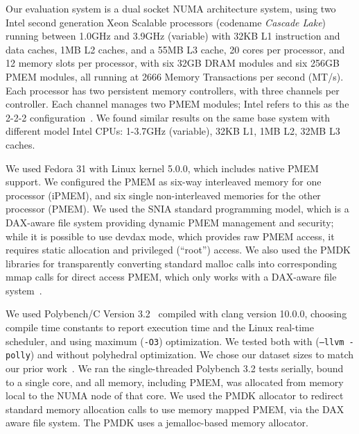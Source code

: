 
Our evaluation system is a dual socket NUMA architecture system, using two Intel\textsuperscript{\textregistered} second generation Xeon\textsuperscript{\textregistered} Scalable processors (codename \textit{Cascade Lake}) running between 1.0GHz and 3.9GHz (variable) with 32KB L1 instruction and data caches, 1MB L2 caches, and a 55MB L3 cache, 20 cores per processor, and 12 memory slots per processor, with six 32GB DRAM modules and six 256GB PMEM modules, all running at 2666 Memory Transactions per second (MT/s). Each processor has two persistent memory controllers, with three channels per controller.  Each channel manages two PMEM modules; Intel refers to this as the 2-2-2 configuration~\cite{intel2019quickstart}. We found similar results on the same base system with different model Intel CPUs: 1-3.7GHz (variable), 32KB L1, 1MB L2, 32MB L3 caches.

We used Fedora 31 with Linux kernel 5.0.0, which includes native PMEM support. We configured the PMEM as six-way interleaved memory for one processor (iPMEM), and six single non-interleaved memories for the other processor (PMEM).  We used the SNIA standard programming model, which is a DAX-aware file system providing dynamic PMEM management and security; while it is possible to use devdax mode, which provides raw PMEM access, it requires static allocation and privileged (``root'') access.  We also used the PMDK libraries for transparently converting standard malloc calls into corresponding mmap calls for direct access PMEM, which only works with a DAX-aware file system~\cite{PMDK}.


We used Polybench/C Version 3.2~\cite{polybench,yuki2014understanding,yuki2015polybench} compiled with clang version 10.0.0, choosing compile time constants to report execution time and the Linux real-time scheduler, and using maximum (\texttt{-O3}) optimization. We tested both with (\texttt{--llvm -polly}) and without polyhedral optimization. We chose our dataset sizes to match our prior work~\cite{doudali2017comerge}.  We ran the single-threaded Polybench 3.2 tests serially, bound to a single core, and all memory, including PMEM, was allocated from memory local to the NUMA node of that core.  We used the PMDK allocator to redirect standard memory allocation calls to use memory mapped PMEM, via the DAX aware file system.  The PMDK uses a jemalloc-based memory allocator.

